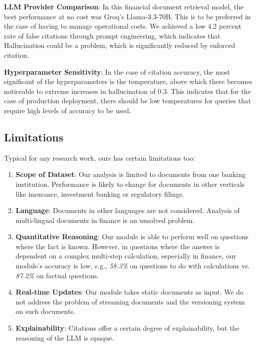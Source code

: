 \documentclass[runningheads]{llncs}
\begin{document}
\textbf{LLM Provider Comparison}:  In this financial document retrieval model, the best performance at no cost was Groq's Llama-3.3-70B. This is to be preferred in the case of having to manage operational costs. We achieved a low 4.2  percent rate of false citations through prompt engineering, which indicates that Hallucination could be a problem, which is significantly reduced by enforced citation.

\textbf{Hyperparameter Sensitivity}: In the case of citation accuracy, the most significant of the hyperparameters is the temperature, above which there becomes noticeable to extreme increases in hallucination of 0.3. This indicates that for the case of production deployment, there should be low temperatures for queries that require high levels of accuracy to be used.

\subsection{Limitations}

Typical for any research work, ours has certain limitations too:  

\begin{enumerate}  

\item \textbf{Scope of Dataset}: Our analysis is limited to documents from one banking institution. Performance is likely to change for documents in other verticals like insurance, investment banking or regulatory filings.  

\item \textbf{Language}: Documents in other languages are not considered. Analysis of multi-lingual documents in finance is an unsolved problem.  

\item \textbf{Quantitative Reasoning}: Our module is able to perform well on questions where the fact is known. However, in questions where the answer is dependent on a complex multi-step calculation, especially in finance, our module's accuracy is low, e.g., \textit{58.3\%} on questions to do with calculations vs. \textit{87.2\%} on factual questions.   

\item \textbf{Real-time Updates}: Our module takes static documents as input. We do not address the problem of streaming documents and the versioning system on such documents.  

\item \textbf{Explainability}: Citations offer a certain degree of explainability, but the reasoning of the LLM is opaque.  

\end{enumerate}
\end{document}
